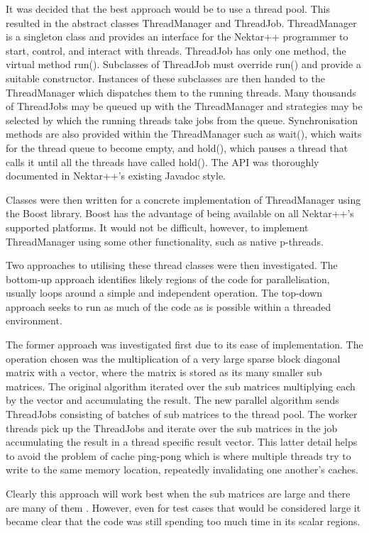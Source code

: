 It was decided that the best approach would be to use a thread pool.  This
resulted in the abstract classes ThreadManager and ThreadJob.  ThreadManager is
a singleton class and provides an interface for the Nektar++ programmer to
start, control, and interact with threads.  ThreadJob has only one method, the
virtual method run().  Subclasses of ThreadJob must override run() and provide a
suitable constructor.  Instances of these subclasses are then handed to the
ThreadManager which dispatches them to the running threads.  Many thousands of
ThreadJobs may be queued up with the ThreadManager and strategies may be
selected by which the running threads take jobs from the queue.  Synchronisation
methods are also provided within the ThreadManager such as wait(), which waits
for the thread queue to become empty, and hold(), which pauses a thread that
calls it until all the threads have called hold().  The API was thoroughly
documented in Nektar++’s existing Javadoc style.

Classes were then written for a concrete implementation of ThreadManager using
the Boost library.  Boost has the advantage of being available on all Nektar++’s
supported platforms.  It would not be difficult, however, to implement
ThreadManager using some other functionality, such as native p-threads.

Two approaches to utilising these thread classes were then investigated.  The
bottom-up approach identifies likely regions of the code for parallelisation,
usually loops around a simple and independent operation.  The top-down approach
seeks to run as much of the code as is possible within a threaded environment.

The former approach was investigated first due to its ease of implementation. 
The operation chosen was the multiplication of a very large sparse block
diagonal matrix with a vector, where the matrix is stored as its many smaller
sub matrices.  The original algorithm iterated over the sub matrices multiplying
each by the vector and accumulating the result.  The new parallel algorithm
sends ThreadJobs consisting of batches of sub matrices to the thread pool.  The
worker threads pick up the ThreadJobs and iterate over the sub matrices in the
job accumulating the result in a thread specific result vector.  This latter
detail helps to avoid the problem of cache ping-pong which is where multiple
threads try to write to the same memory location, repeatedly invalidating one
another's caches.

Clearly this approach will work best when the sub matrices are large and there
are many of them . However, even for test cases that would be considered large
it became clear that the code was still spending too much time in its scalar
regions.

